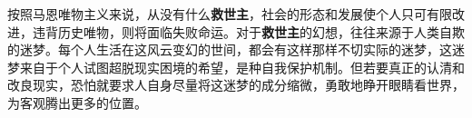 按照马恩唯物主义来说，从没有什么\textbf{救世主}，社会的形态和发展使个人只可有限改进，违背历史唯物，则将面临失败命运。对于\textbf{救世主}的幻想，往往来源于人类自欺的迷梦。每个人生活在这风云变幻的世间，都会有这样那样不切实际的迷梦，这迷梦来自于个人试图超脱现实困境的希望，是种自我保护机制。但若要真正的认清和改良现实，恐怕就要求人自身尽量将这迷梦的成分缩微，勇敢地睁开眼睛看世界，为客观腾出更多的位置。







